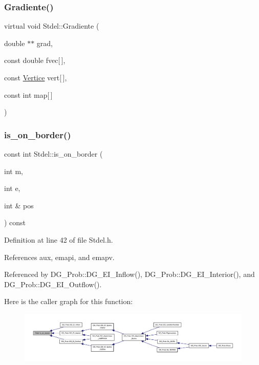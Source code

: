\subsubsection{\texorpdfstring{Gradiente()}{Gradiente()}\hspace{0.1cm}{\footnotesize\ttfamily [3/3]}}
{\footnotesize\ttfamily virtual void Stdel\+::\+Gradiente (\begin{DoxyParamCaption}\item[{double $\ast$$\ast$}]{grad,  }\item[{const double}]{fvec\mbox{[}$\,$\mbox{]},  }\item[{const \hyperlink{structVertice}{Vertice}}]{vert\mbox{[}$\,$\mbox{]},  }\item[{const int}]{map\mbox{[}$\,$\mbox{]} }\end{DoxyParamCaption})\hspace{0.3cm}{\ttfamily [pure virtual]}}

\mbox{\label{classStdel_abb022f0ad81707e11e3a3091d2d87c46}} 
\subsubsection{\texorpdfstring{is\+\_\+on\+\_\+border()}{is\_on\_border()}}
{\footnotesize\ttfamily const int Stdel\+::is\+\_\+on\+\_\+border (\begin{DoxyParamCaption}\item[{int}]{m,  }\item[{int}]{e,  }\item[{int \&}]{pos }\end{DoxyParamCaption}) const\hspace{0.3cm}{\ttfamily [inline]}}



Definition at line 42 of file Stdel.\+h.



References aux, emapi, and emapv.



Referenced by D\+G\+\_\+\+Prob\+::\+D\+G\+\_\+\+E\+I\+\_\+\+Inflow(), D\+G\+\_\+\+Prob\+::\+D\+G\+\_\+\+E\+I\+\_\+\+Interior(), and D\+G\+\_\+\+Prob\+::\+D\+G\+\_\+\+E\+I\+\_\+\+Outflow().

Here is the caller graph for this function\+:
\nopagebreak
\begin{figure}[H]
\begin{center}
\leavevmode
\includegraphics[width=350pt]{classStdel_abb022f0ad81707e11e3a3091d2d87c46_icgraph}
\end{center}
\end{figure}
\mbox{\label{classStdel_a953ff994c1bb423245aff079932c648f}} 
